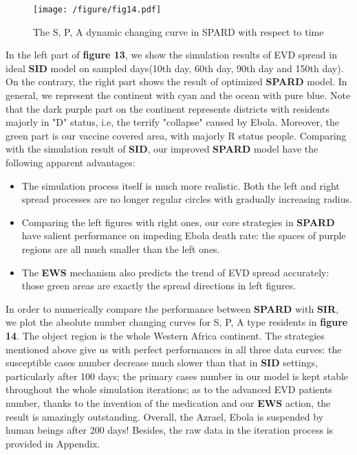 {\begin{figure}[htbp]
\centering
\texttt{[image: /figure/fig14.pdf]}
\caption{The S, P, A dynamic changing curve in SPARD with respect to time}
\end{figure}

In the left part of \textbf{figure 13}, we show the simulation results of EVD spread in ideal \textbf{SID} model on sampled days(10th day, 60th day, 90th day and 150th day). On the contrary, the right part shows the result of optimized \textbf{SPARD} model. In general, we represent the continent with cyan and the ocean with pure blue. Note that the dark purple part on the continent represents districts with residents majorly in "D" status, i.e, the terrify "collapse" caused by Ebola. Moreover, the green part is our vaccine covered area, with majorly R status people. Comparing with the simulation result of \textbf{SID}, our improved  \textbf{SPARD} model have the following apparent advantages:

\begin{itemize}
\item The simulation process itself is much more realistic. Both the left and right spread processes are no longer regular circles with gradually increasing radius.

\item Comparing the left figures with right ones, our core strategies in \textbf{SPARD} have salient performance on impeding Ebola death rate: the spaces of purple regions are all much smaller than the left ones.

\item The \textbf{EWS} mechanism also predicts the trend of EVD spread accurately: those green areas are exactly the spread directions in left figures.
\end{itemize}

In order to numerically compare the performance between \textbf{SPARD} with \textbf{SIR}, we plot the absolute number changing curves for S, P, A type residents in \textbf{figure 14}. The object region is the whole Western Africa continent. The strategies mentioned above give us with perfect performances in all three data curves: the susceptible cases number decrease much slower than that in \textbf{SID} settings, particularly after 100 days; the primary cases number in our model is kept stable throughout the whole simulation iterations; as to the advanced EVD patients number, thanks to the invention of the medication and our \textbf{EWS} action, the result is amazingly outstanding. Overall, the Azrael, Ebola is suspended by human beings after 200 days! Besides, the raw data in the iteration process is provided in Appendix.

}
